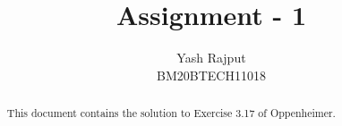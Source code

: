 \documentclass[journal,12pt,twocolumn]{IEEEtran}
\renewcommand\thesection{\arabic{section}}
\begin{document}
\def\putbox#1#2#3{\makebox[0in][l]{\makebox[#1][l]{}\raisebox{\baselineskip}[0in][0in]{\raisebox{#2}[0in][0in]{#3}}}}
     \def\rightbox#1{\makebox[0in][r]{#1}}
     \def\centbox#1{\makebox[0in]{#1}}
     \def\topbox#1{\raisebox{-\baselineskip}[0in][0in]{#1}}
     \def\midbox#1{\raisebox{-0.5\baselineskip}[0in][0in]{#1}}

\vspace{3cm}

\title{Assignment - 1}

\author{Yash Rajput\\BM20BTECH11018} 

\maketitle






\bigskip

\begin{abstract}
This document contains the solution to Exercise 3.17 of Oppenheimer.
\end{abstract}
\end{document}
